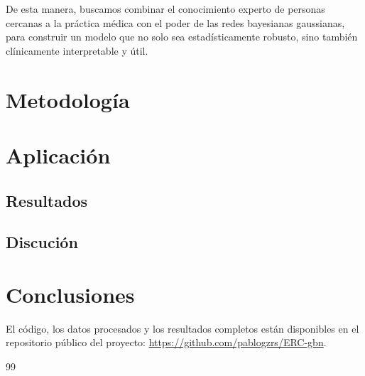 \documentclass[eng]{ajceam-class}
\begin{document}
De esta manera, buscamos combinar el conocimiento experto de personas cercanas a la práctica médica con el poder de las redes bayesianas gaussianas, para construir un modelo que no solo sea estadísticamente robusto, sino también clínicamente interpretable y útil.


\section{Metodología}


\section{Aplicación}

\subsection{Resultados}

\subsection{Discución}


\section{Conclusiones}


El código, los datos procesados y los resultados completos están disponibles en el repositorio público del proyecto: \url{https://github.com/pablogzrs/ERC-gbn}.

\renewcommand{\refname}{Bibliografía}
\begin{thebibliography}{99}



\end{thebibliography}
\end{document}
